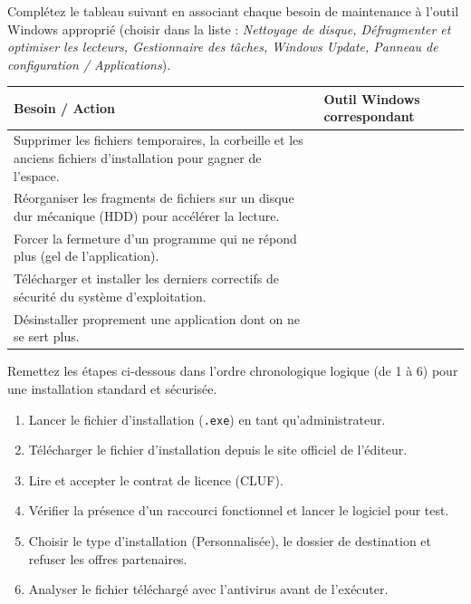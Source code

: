 \documentclass[11pt]{article}
\begin{document}
\begin{exercice}
Complétez le tableau suivant en associant chaque besoin de maintenance à l'outil Windows approprié (choisir dans la liste : \textit{Nettoyage de disque, Défragmenter et optimiser les lecteurs, Gestionnaire des tâches, Windows Update, Panneau de configuration / Applications}).
\begin{center}
\begin{tabularx}{\linewidth}{|>{\raggedright\arraybackslash}X|>{\centering\arraybackslash}X|}
\hline
\textbf{Besoin / Action} & \textbf{Outil Windows correspondant} \\
\hline
Supprimer les fichiers temporaires, la corbeille et les anciens fichiers d'installation pour gagner de l'espace. & \\
\hline
Réorganiser les fragments de fichiers sur un disque dur mécanique (HDD) pour accélérer la lecture. & \\
\hline
Forcer la fermeture d'un programme qui ne répond plus (gel de l'application). & \\
\hline
Télécharger et installer les derniers correctifs de sécurité du système d'exploitation. & \\
\hline
Désinstaller proprement une application dont on ne se sert plus. & \\
\hline
\end{tabularx}
\end{center}
\end{exercice}

\begin{exercice}
Remettez les étapes ci-dessous dans l'ordre chronologique logique (de 1 à 6) pour une installation standard et sécurisée.
\begin{enumerate}
    \item Lancer le fichier d'installation (\texttt{.exe}) en tant qu'administrateur.
    \item Télécharger le fichier d'installation depuis le site officiel de l'éditeur.
    \item Lire et accepter le contrat de licence (CLUF).
    \item Vérifier la présence d'un raccourci fonctionnel et lancer le logiciel pour test.
    \item Choisir le type d'installation (Personnalisée), le dossier de destination et refuser les offres partenaires.
    \item Analyser le fichier téléchargé avec l'antivirus avant de l'exécuter.
\end{enumerate}
\end{exercice}
\end{document}
